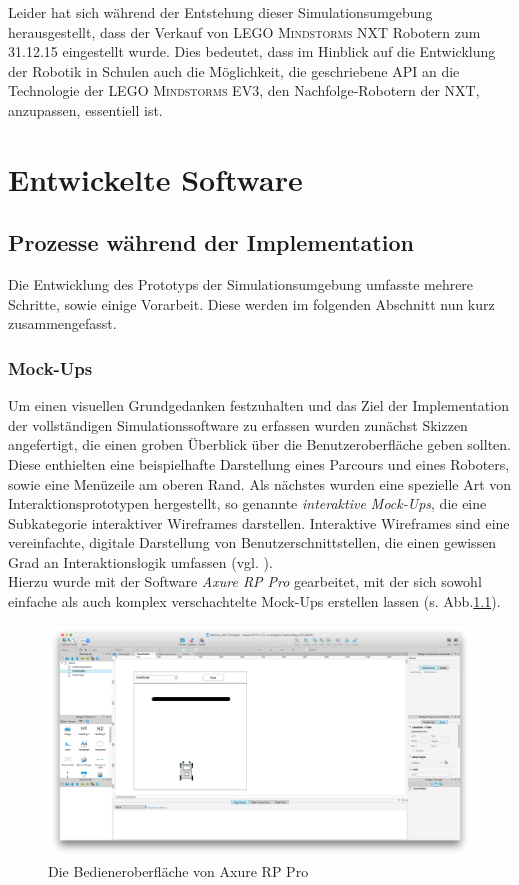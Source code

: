 \documentclass[paper=a4, DIV=14, BCOR=15mm, twoside=on, onecolumn=on, open = right, titlepage =on, parskip =half, headsepline = on, footsepline = on, chapterprefix = on, appendixprefix = off, fontsize = 12pt, numbers = noenddot, abstract = on]{scrbook}
\begin{document}
Leider hat sich während der Entstehung dieser Simulationsumgebung herausgestellt, dass der Verkauf von \textsc{LEGO Mindstorms} NXT Robotern zum 31.12.15 eingestellt wurde. Dies bedeutet, dass im Hinblick auf die Entwicklung der Robotik in Schulen auch die Möglichkeit, die geschriebene API an die Technologie der \textsc{LEGO Mindstorms} EV3, den Nachfolge-Robotern der NXT, anzupassen, essentiell ist.


\par \singlespacing
\chapter{Entwickelte Software}
\onehalfspacing
\par \singlespacing
\section{Prozesse während der Implementation}
\onehalfspacing
Die Entwicklung des Prototyps der Simulationsumgebung umfasste mehrere Schritte, sowie einige Vorarbeit. Diese werden im folgenden Abschnitt nun kurz zusammengefasst.
\par \singlespacing
\subsection{Mock-Ups} 
\onehalfspacing
Um einen visuellen Grundgedanken festzuhalten und das Ziel der Implementation der vollständigen Simulationssoftware zu erfassen wurden zunächst Skizzen angefertigt, die einen groben Überblick über die Benutzeroberfläche geben sollten. Diese enthielten eine beispielhafte Darstellung eines Parcours und eines Roboters, sowie eine Menüzeile am oberen Rand. Als nächstes wurden eine spezielle Art von Interaktionsprototypen hergestellt, so genannte \emph{interaktive Mock-Ups}, die eine Subkategorie interaktiver Wireframes darstellen. Interaktive Wireframes sind eine vereinfachte, digitale Darstellung von Benutzerschnittstellen, die einen gewissen Grad an Interaktionslogik umfassen (vgl. \cite[S.162ff.]{moser:12}).\\
 Hierzu wurde mit der Software \emph{Axure RP Pro} gearbeitet, mit der sich sowohl einfache als auch komplex verschachtelte Mock-Ups erstellen lassen (s. Abb.\ref{fig:axure}).

\begin{figure}[htbp]
\centering
\includegraphics[scale=0.2]{images/axure_mockup.png} 
\caption{Die Bedieneroberfläche von Axure RP Pro}
\label{fig:axure}
\end{figure}
\end{document}
